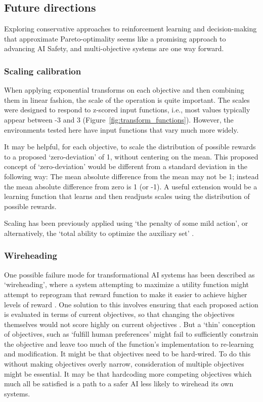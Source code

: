 \subsection{Future directions}

Exploring conservative approaches to reinforcement learning and decision-making that approximate Pareto-optimality seems like a promising approach to advancing AI Safety, and multi-objective systems are one way forward.%

\subsubsection{Scaling calibration}

When applying exponential transforms on each objective and then combining them in linear fashion, the scale of the operation is quite important. The scales were designed to respond to z-scored input functions, i.e., most values typically appear between -3 and 3 (Figure~\ref{fig:transform_functions}). However, the environments tested here have input functions that vary much more widely.

It may be helpful, for each objective, to scale the distribution of possible rewards to a proposed `zero-deviation' of 1, without centering on the mean. This proposed concept of `zero-deviation' would be different from a standard deviation in the following way: The mean absolute difference from the mean may not be 1; instead the mean absolute difference from zero is 1 (or -1). A useful extension would be a learning function that learns and then readjusts scales using the distribution of possible rewards.

Scaling has been previously applied using `the penalty of some mild action', or alternatively, the `total ability to optimize the auxiliary set' %
\cite{turner_conservative_2020}.


\subsubsection{Wireheading}

One possible failure mode for  transformational AI systems has been described as `wireheading', where a system attempting to maximize a utility function might attempt to reprogram that reward function to make it easier to achieve higher levels of reward \cite{demski_a_stable_2017}. One solution to this involves ensuring that each proposed action is evaluated in terms of current objectives, so that changing the objectives themselves would not score highly on current objectives \cite{dewey_learning_2011}. But a `thin' conception of objectives, such as `fulfill human preferences' might fail to sufficiently constrain the objective and leave too much of the function's implementation to re-learning and modification. It might be that objectives need to be hard-wired. To do this without making objectives overly narrow, consideration of multiple objectives might be essential. It may be that hardcoding more competing objectives which much all be satisfied is a path to a safer AI less likely to wirehead its own systems.


